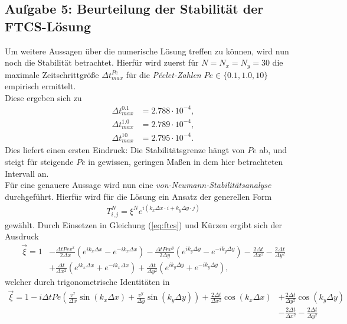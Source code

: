 \documentclass[12pt,a4paper,titlepage,headinclude,bibtotoc]{scrartcl}
\begin{document}
\subsection{Aufgabe 5: Beurteilung der Stabilität der FTCS-Lösung}
\label{sec:task5}
Um weitere Aussagen über die numerische Lösung treffen zu können, wird nun noch die Stabilität betrachtet. Hierfür wird zuerst für $N=N_x=N_y = 30$ die maximale Zeitschrittgröße $\Delta t^{Pe}_{max}$ für die \textit{Péclet-Zahlen} $Pe \in \{0.1, 1.0, 10\}$ empirisch ermittelt.\\
Diese ergeben sich zu
\begin{align*}
\Delta t^{0.1}_{max} &= 2.788 \cdot 10^{-4}, \\
\Delta t^{1.0}_{max} &= 2.789 \cdot 10^{-4}, \\
\Delta t^{10}_{max}  &= 2.795 \cdot 10^{-4} .
\end{align*}
Dies liefert einen ersten Eindruck: Die Stabilitätsgrenze hängt von $Pe$ ab, und steigt für steigende $Pe$ in gewissen, geringen Maßen in dem hier betrachteten Intervall an.\\
Für eine genauere Aussage wird nun eine \textit{von-Neumann-Stabilitätsanalyse} durchgeführt. Hierfür wird für die Lösung ein Ansatz der generellen Form
\begin{align*}
T^N_{i,j} = \xi^N e^{i(k_x \Delta x \cdot i + k_y \Delta y \cdot j)}
\end{align*}
gewählt.
Durch Einsetzen in Gleichung (\ref{eq:ftcs}) und Kürzen ergibt sich der Ausdruck
\begin{align*}
\vec{\xi} = 1 &- \frac{\Delta t Pe v^x}{2 \Delta x} \left( e^{i k_x \Delta x} - e^{-i k_x \Delta x} \right) - \frac{\Delta t Pe v^y}{2 \Delta y} \left( e^{i k_y \Delta y} - e^{-i k_y \Delta y} \right) -\frac{2 \Delta t}{\Delta x^2} - \frac{2 \Delta t}{\Delta y^2} \\
 &+ \frac{\Delta t}{\Delta x^2} \left( e^{i k_x \Delta x} + e^{-i k_x \Delta x} \right) +\frac{\Delta t}{\Delta y^2} \left( e^{i k_y \Delta y} + e^{-i k_y \Delta y} \right),
\end{align*}
welcher durch trigonometrische Identitäten in
\begin{align*}
\vec{\xi} = 1 - i \Delta t Pe\left(\frac{ v^x }{\Delta x} \sin(k_x \Delta x) + \frac{v^y}{\Delta y}  \sin(k_y \Delta y) \right) + \frac{2 \Delta t}{\Delta x^2}\cos(k_x \Delta x) &+ \frac{2 \Delta t}{\Delta y^2}\cos(k_y \Delta y) \\ &-\frac{2 \Delta t}{\Delta x^2} - \frac{2 \Delta t}{\Delta y^2}
\end{align*}
\end{document}

